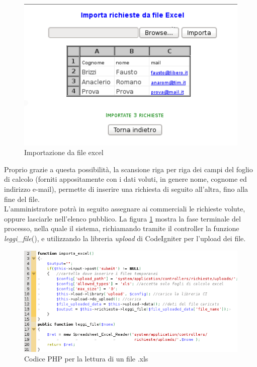 \begin{figure}[!ht]
\centering
  \includegraphics[scale=0.8]{./images/importaExcelScreen.png}
\caption{Importazione da file excel}
\label{excel}
\end{figure}

\noindent
Proprio grazie a questa possibilit\`a, la scansione riga per riga dei campi del foglio di calcolo (forniti appositamente con i dati voluti, in genere nome, cognome ed indirizzo e-mail), permette di inserire una richiesta di seguito all'altra, fino alla fine del file.\\
 L'amministratore potr\`a in seguito assegnare ai commerciali le richieste volute, oppure lasciarle nell'elenco pubblico. 
\newpage
La figura \ref{excel} mostra la fase terminale del processo, nella quale il sistema, richiamando tramite il controller la funzione \textit{leggi\_file}(), e utilizzando la libreria \textit{upload} di CodeIgniter per l'upload dei file.

\begin{figure}[!ht]
\centering
  \includegraphics[scale=0.9]{./images/codiceexcel.png}
\caption{Codice PHP per la lettura di un file .xls}
\label{excelcode}
\end{figure}

